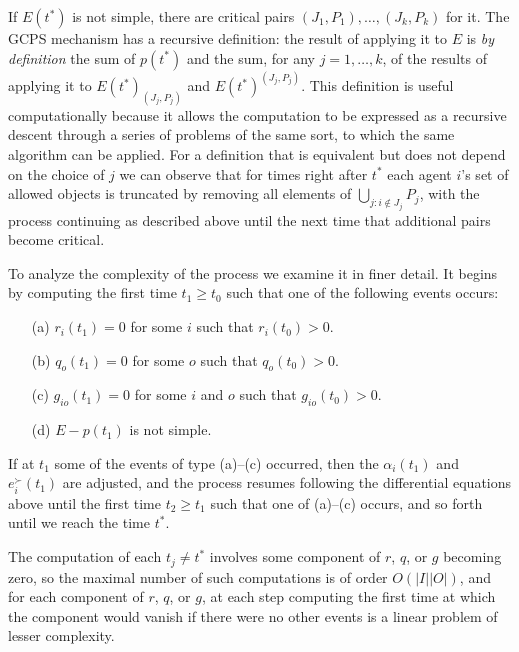 \documentclass[12pt]{article}
\theoremstyle{definition}
\begin{document}
If $E(t^*)$ is not simple, there are critical pairs $(J_1,P_1), \ldots, (J_k,P_k)$ for it.  
The GCPS mechanism has a recursive definition: the result of applying it to $E$ is \emph{by definition} the sum of $p(t^*)$ and the sum, for any $j = 1, \ldots, k$, of the results of applying it to $E(t^*)_{(J_j,P_j)}$ and $E(t^*)^{(J_j,P_j)}$.  This definition is useful computationally because it allows the computation to be expressed as a recursive descent through a series of problems of the same sort, to which the same algorithm can be applied.  For a definition that is equivalent but does not depend on the choice of $j$ we can observe that for times right after $t^*$ each agent $i$'s set of allowed objects is truncated by removing all elements of $\bigcup_{j: i \notin J_j} P_j$, with the process continuing as described above until the next time that additional pairs become critical.

To analyze the complexity of the process we examine it in finer detail.  It begins by computing the first time $t_1 \ge t_0$ such that one of the following events occurs:
\begin{enumerate}
  \item[(a)] $r_i(t_1) = 0$ for some $i$ such that $r_i(t_0) > 0$.
  \item[(b)] $q_o(t_1) = 0$ for some $o$ such that $q_o(t_0) > 0$. 
  \item[(c)] $g_{io}(t_1) = 0$ for some $i$ and $o$ such that $g_{io}(t_0) > 0$. 
  \item[(d)] $E - p(t_1)$ is not simple.
\end{enumerate}
If at $t_1$ some  of the events of type (a)--(c) occurred, then the $\alpha_i(t_1)$ and $e_i^\succ(t_1)$ are adjusted, and the process resumes following the differential equations above until the first time $t_2 \ge t_1$ such that one of (a)--(c) occurs, and so forth until we reach the time $t^*$. 

The computation of each $t_j \ne t^*$ involves some component of $r$, $q$, or $g$ becoming zero, so the maximal number of such computations is of order $O(|I||O|)$, and for each component of $r$, $q$, or $g$, at each step computing the first time at which the component would vanish if there were no other events is a linear problem of lesser complexity.
\end{document}
